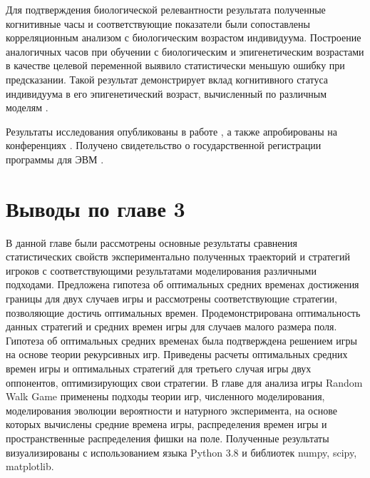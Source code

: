 Для подтверждения биологической релевантности результата полученные когнитивные часы и соответствующие показатели были сопоставлены корреляционным анализом с биологическим возрастом индивидуума. Построение аналогичных часов при обучении с биологическим и эпигенетическим возрастами в качестве целевой переменной выявило статистически меньшую ошибку при предсказании. Такой результат демонстрирует вклад когнитивного статуса индивидуума в его эпигенетический возраст, вычисленный по различным моделям \cite{levine_epigenetic_2018,horvath_dna_2013,lu_dna_2019}.

Результаты исследования опубликованы в работе \cite{bib4}, а также апробированы на конференциях \cite{confbib2,confbib3}. Получено свидетельство о государственной регистрации программы для ЭВМ \cite{progbib2}.
 

\section{Выводы по главе 3}\label{sec:ch3/sec6}

В данной главе были рассмотрены основные результаты сравнения статистических свойств экспериментально полученных траекторий и стратегий игроков с соответствующими результатами моделирования различными подходами. Предложена гипотеза об оптимальных средних временах достижения границы для двух случаев игры и рассмотрены соответствующие стратегии, позволяющие достичь оптимальных времен. Продемонстрирована оптимальность данных стратегий и средних времен игры для случаев малого размера поля. Гипотеза об оптимальных средних временах была подтверждена решением игры на основе теории рекурсивных игр. Приведены расчеты оптимальных средних времен игры и оптимальных стратегий для третьего случая игры двух оппонентов, оптимизирующих свои стратегии. В главе для анализа игры Random Walk Game применены подходы теории игр, численного моделирования, моделирования эволюции вероятности и натурного эксперимента, на основе которых вычислены средние времена игры, распределения времен игры и пространственные распределения фишки на поле. Полученные результаты визуализированы с использованием языка Python 3.8 и библиотек numpy, scipy, matplotlib. 
